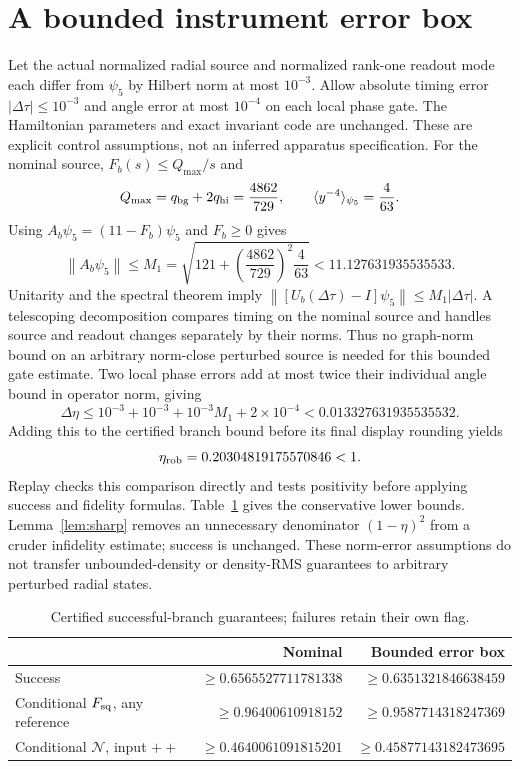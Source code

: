 \documentclass[11pt]{article}
\newcommand{\norm}[1]{\left\lVert#1\right\rVert}
\begin{document}
\section{A bounded instrument error box}
Let the actual normalized radial source and normalized rank-one readout mode each differ from $\psi_5$ by Hilbert norm at most $10^{-3}$.
Allow absolute timing error $|\Delta\tau|\leq10^{-3}$ and angle error at most $10^{-4}$ on each local phase gate.
The Hamiltonian parameters and exact invariant code are unchanged.
These are explicit control assumptions, not an inferred apparatus specification.
For the nominal source, $F_b(s)\leq Q_{\max}/s$ and
\begin{equation}
 Q_{\max}=q_{\rm bg}+2q_{\rm hi}=\frac{4862}{729},\qquad
 \langle y^{-4}\rangle_{\psi_5}=\frac4{63}.
\end{equation}
Using $A_b\psi_5=(11-F_b)\psi_5$ and $F_b\geq0$ gives
\begin{equation}
 \norm{A_b\psi_5}\leq M_1=
 \sqrt{121+\left(\frac{4862}{729}\right)^2\frac4{63}}
 <11.127631935535533.\label{eq:M1}
\end{equation}
Unitarity and the spectral theorem imply $\norm{[U_b(\Delta\tau)-I]\psi_5}\leq M_1|\Delta\tau|$.
A telescoping decomposition compares timing on the nominal source and handles source and readout changes separately by their norms.
Thus no graph-norm bound on an arbitrary norm-close perturbed source is needed for this bounded gate estimate.
Two local phase errors add at most twice their individual angle bound in operator norm, giving
\begin{equation}
 \Delta\eta\leq10^{-3}+10^{-3}+10^{-3}M_1+2\times10^{-4}
 <0.013327631935535532.\label{eq:extra}
\end{equation}
Adding this to the certified branch bound before its final display rounding yields
\begin{equation}
 \eta_{\rm rob}=0.20304819175570846<1.\label{eq:rob}
\end{equation}
Replay checks this comparison directly and tests positivity before applying success and fidelity formulas.
Table~\ref{tab:gate} gives the conservative lower bounds.
Lemma~\ref{lem:sharp} removes an unnecessary denominator $(1-\eta)^2$ from a cruder infidelity estimate; success is unchanged.
These norm-error assumptions do not transfer unbounded-density or density-RMS guarantees to arbitrary perturbed radial states.
\begin{table}[htbp]
\centering
\caption{Certified successful-branch guarantees; failures retain their own flag.}
\label{tab:gate}
\begin{tabular}{lrr}
\toprule
 & Nominal & Bounded error box\\
\midrule
Success & $\geq0.6565527711781338$ & $\geq0.6351321846638459$\\
Conditional $F_{\rm sq}$, any reference & $\geq0.96400610918152$ & $\geq0.9587714318247369$\\
Conditional $\mathcal N$, input $++$ & $\geq0.4640061091815201$ & $\geq0.45877143182473695$\\
\bottomrule
\end{tabular}
\end{table}
\end{document}
